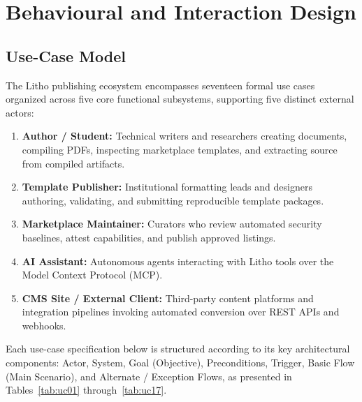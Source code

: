 \section{Behavioural and Interaction Design}
\subsection{Use-Case Model}

The Litho publishing ecosystem encompasses seventeen formal use cases organized across five core functional subsystems, supporting five distinct external actors:
\begin{enumerate}
    \item \textbf{Author / Student:} Technical writers and researchers creating documents, compiling PDFs, inspecting marketplace templates, and extracting source from compiled artifacts.
    \item \textbf{Template Publisher:} Institutional formatting leads and designers authoring, validating, and submitting reproducible template packages.
    \item \textbf{Marketplace Maintainer:} Curators who review automated security baselines, attest capabilities, and publish approved listings.
    \item \textbf{AI Assistant:} Autonomous agents interacting with Litho tools over the Model Context Protocol (MCP).
    \item \textbf{CMS Site / External Client:} Third-party content platforms and integration pipelines invoking automated conversion over REST APIs and webhooks.
\end{enumerate}

Each use-case specification below is structured according to its key architectural components: Actor, System, Goal (Objective), Preconditions, Trigger, Basic Flow (Main Scenario), and Alternate / Exception Flows, as presented in Tables~\ref{tab:uc01} through~\ref{tab:uc17}.

